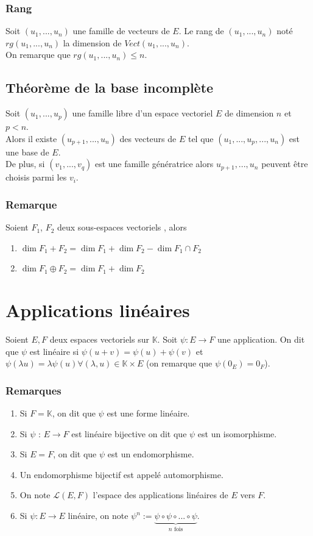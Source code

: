 \documentclass[a4paper,10pt]{book} %
\newcommand{\K}{\mathbb{K}}
\newcommand{\evs}{espaces vectoriels }
\newcommand{\ev}{espace vectoriel }
\newcommand{\sevs}{sous-espaces vectoriels }
\begin{document}
\subsubsection{Rang}
Soit $(u_1,...,u_n)$ une famille de vecteurs de $E$. Le rang de $(u_1,...,u_n)$ noté $rg(u_1,...,u_n)$ la dimension de $Vect(u_1,...,u_n)$.\\

On remarque que $rg(u_1,...,u_n)\leq n$.

\newpage

\subsection{Théorème de la base incomplète}
Soit $(u_1,...,u_p)$ une famille libre d'un \ev $E$ de dimension $n$ et $p<n$.\\

Alors il existe $(u_{p+1},...,u_n)$ des vecteurs de $E$ tel que $(u_1,...,u_p,...,u_n)$ est une base de $E$.\\

De plus, si $(v_1,...,v_q)$ est une famille génératrice alors $u_{p+1},...,u_n$ peuvent être choisis parmi les $v_i$.

\subsubsection{Remarque}
Soient $F_1$, $F_2$ deux \sevs, alors
\begin{enumerate}
\item $\dim F_1+F_2=\dim F_1+\dim F_2-\dim F_1\cap F_2$
\item $\dim F_1\oplus F_2=\dim F_1 +\dim F_2$
\end{enumerate}

\section{Applications linéaires}
Soient $E,F$ deux \evs sur $\K$. Soit $\psi : E \rightarrow F$ une application. On dit que $\psi$ est linéaire si $\psi(u+v)=\psi(u)+\psi(v)$ et $\psi(\lambda u)=\lambda \psi(u) \forall (\lambda,u)\in \K\times E$ (on remarque que $\psi(0_E)=0_F$).

\subsubsection{Remarques}
\begin{enumerate}
\item Si $F=\K$, on dit que $\psi$ est une forme linéaire.
\item Si $\psi$ : $E\rightarrow F$ est linéaire bijective on dit que $\psi$ est un isomorphisme.
\item Si $E=F$, on dit que $\psi$ est un endomorphisme.
\item Un endomorphisme bijectif est appelé automorphisme.
\item On note $\mathcal{L}(E,F)$ l'espace des applications linéaires de $E$ vers $F$.
\item Si $\psi : E \rightarrow E$ linéaire, on note $\psi^n:=\underset{n\text{ fois}}{\underbrace{\psi\circ \psi \circ...\circ \psi}}$.
\end{enumerate}
\end{document}
